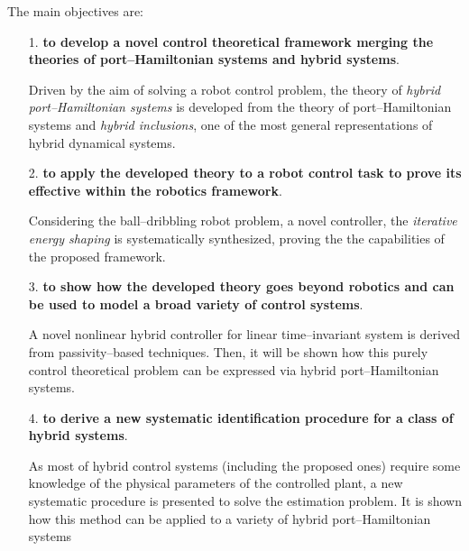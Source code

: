 The main objectives are:
%
\begin{itemize}
    \item [1.] \textbf{to develop a novel control theoretical framework merging the theories of port--Hamiltonian systems and hybrid systems}.
    
    Driven by the aim of solving a robot control problem, the theory of \textit{hybrid port--Hamiltonian systems} is developed from the theory of port--Hamiltonian systems and \textit{hybrid inclusions}, one of the most general representations of hybrid dynamical systems.
    \newline
    \item [2.] \textbf{to apply the developed theory to a robot control task to prove its effective within the robotics framework}. 
    
    Considering the ball--dribbling robot problem, a novel controller, the \textit{iterative energy shaping} is systematically synthesized, proving the the capabilities of the proposed framework.
    \newline
    \item [3.] \textbf{to show how the developed theory goes beyond robotics and can be used to model a broad variety of control systems}. 
    
    A novel nonlinear hybrid controller for linear time--invariant system is derived from passivity--based techniques. Then, it will be shown how this purely control theoretical problem can be expressed via hybrid port--Hamiltonian systems.
    \newline
    \item[4.] \textbf{to derive a new systematic identification procedure for a class of hybrid systems}.
    
    As most of hybrid control systems (including the proposed ones) require some knowledge of the physical parameters of the controlled plant, a new systematic procedure is presented to solve the estimation problem. It is shown how this method can be applied to a variety of hybrid port--Hamiltonian systems 
    
    \end{itemize}
%





%
\clearpage

